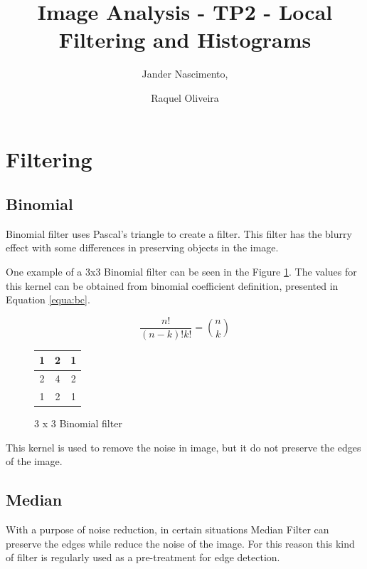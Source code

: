 \documentclass{article}
\begin{document}
\title{Image Analysis - TP2 - Local Filtering and Histograms}

\author{Jander Nascimento, 
\and Raquel Oliveira}

\maketitle

\section{Filtering}
	
	\subsection{Binomial}

		Binomial filter uses Pascal's triangle to create a filter. This filter has the blurry effect with some differences in preserving objects in the image.

One example of a 3x3 Binomial filter can be seen in the Figure \ref{3x3binomial}. The values for this kernel can be obtained from binomial coefficient definition, presented in Equation \ref{equa:bc}.

\begin{equation}
\frac{n!}{(n-k)!k!}={n \choose k}
\label{equa:bc}
\end{equation}

\begin{figure}[H]
  \begin{center}
  \begin{tabular}{ | c | c | c | }
    \hline
    1 & 2 & 1 \\ \hline

    2 & 4 & 2 \\ \hline

    1 & 2 & 1 \\
    \hline
  \end{tabular}
  \end{center}
  \caption{3 x 3 Binomial filter\label{3x3binomial}}\end{figure}

		This kernel is used to remove the noise in image, but it do not preserve the edges of the image. 
		
	\subsection{Median}

		With a purpose of noise reduction, in certain situations Median Filter can preserve the edges while reduce the noise of the image. For this reason this kind of filter is regularly used as a pre-treatment for edge detection.
\end{document}
